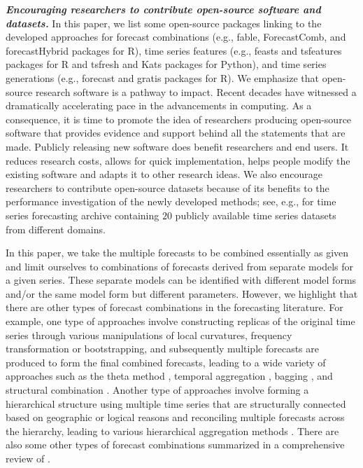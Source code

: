 \documentclass[11pt]{article}
\newcommand{\pkg}[1]{{\normalfont\fontseries{b}\selectfont #1}}
\let\proglang=\textsf
\begin{document}
\textbf{\textit{Encouraging researchers to contribute open-source software and datasets.}} In this paper, we list some open-source packages linking to the developed approaches for forecast combinations (e.g., \pkg{fable}, \pkg{ForecastComb}, and \pkg{forecastHybrid} packages for \proglang{R}), time series features (e.g., \pkg{feasts} and \pkg{tsfeatures} packages for \proglang{R} and \pkg{tsfresh} and \pkg{Kats} packages for \proglang{Python}), and time series generations (e.g., \pkg{forecast} and \pkg{gratis} packages for \proglang{R}). We emphasize that open-source research software is a pathway to impact. Recent decades have witnessed a dramatically accelerating pace in the advancements in computing. As a consequence, it is time to promote the idea of researchers producing open-source software that provides evidence and support behind all the statements that are made. Publicly releasing new software does benefit researchers and end users. It reduces research costs, allows for quick implementation, helps people modify the existing software and adapts it to other research ideas. We also encourage researchers to contribute open-source datasets because of its benefits to the performance investigation of the newly developed methods; see, e.g., \citet{Godahewa2021-mo,Godahewa2021-wb} for time series forecasting archive containing $20$ publicly available time series datasets from different domains.

In this paper, we take the multiple forecasts to be combined essentially as given and limit ourselves to combinations of forecasts derived from separate models for a given series. These separate models can be identified with different model forms and/or the same model form but different parameters. However, we highlight that there are other types of forecast combinations in the forecasting literature. For example, one type of approaches involve constructing replicas of the original time series through various manipulations of local curvatures, frequency transformation or bootstrapping, and subsequently multiple forecasts are produced to form the final combined forecasts, leading to a wide variety of approaches such as the theta method \citep{Assimakopoulos2000-cc}, temporal aggregation \citep[e.g.,][]{Kourentzes2014-wz,Kourentzes2016-qq,Kourentzes2017-xe}, bagging \citep[e.g.,][]{Bergmeir2016-ae,Petropoulos2018-fw}, and structural combination \citep[e.g.,][]{Rendon-Sanchez2019-qm}. Another type of approaches involve forming a hierarchical structure using multiple time series that are structurally connected based on geographic or logical reasons and reconciling multiple forecasts across the hierarchy, leading to various hierarchical aggregation methods \citep[e.g.,][]{Hyndman2011-sd,Wickramasuriya2019-fc,Taieb2021-tc,Hollyman2021-tn}. There are also some other types of forecast combinations summarized in a comprehensive review of \citet{Petropoulos2021-ft}.

% 
% 
\printbibliography
\end{document}
